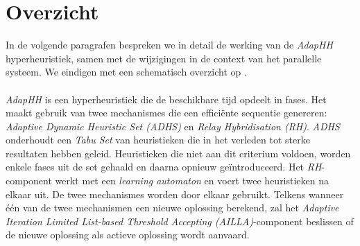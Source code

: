 \section{Overzicht}

In de volgende paragrafen bespreken we in detail de werking van de \emph{AdapHH} hyperheuristiek, samen met de wijzigingen in de context van het parallelle systeem. We eindigen met een schematisch overzicht op .

\paragraph{}
\emph{AdapHH} is een hyperheuristiek die de beschikbare tijd opdeelt in fases. Het maakt gebruik van twee mechanismes die een effici\"ente sequentie genereren: \emph{Adaptive Dynamic Heuristic Set (ADHS)} en \emph{Relay Hybridisation (RH)}. \emph{ADHS} onderhoudt een \emph{Tabu Set} van heuristieken die in het verleden tot sterke resultaten hebben geleid. Heuristieken die niet aan dit criterium voldoen, worden enkele fases uit de set gehaald en daarna opnieuw ge\"introduceerd. Het \emph{RH}-component werkt met een \emph{learning automaton}\cite{RePEc:cla:levarc:481} en voert twee heuristieken na elkaar uit. De twee mechanismes worden door elkaar gebruikt. Telkens wanneer \'e\'en van de twee mechanismen een nieuwe oplossing berekend, zal het \emph{Adaptive Iteration Limited List-based Threshold Accepting (AILLA)}-component beslissen of de nieuwe oplossing als actieve oplossing wordt aanvaard.